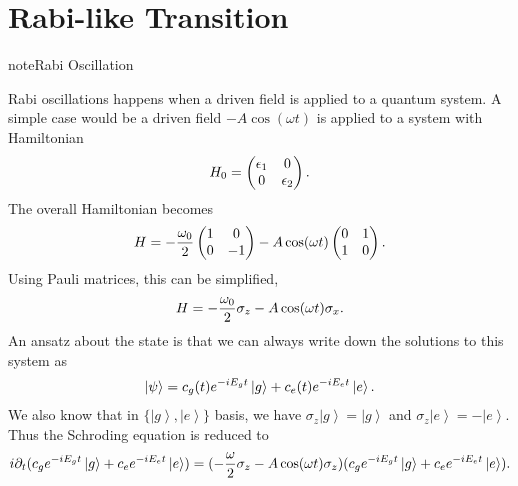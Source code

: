 \documentclass[letterpaper,12pt,english]{sphinxmanual}
\newcommand{\ket}[1]{\left| #1\right\rangle}
\begin{document}
\section{Rabi-like Transition}
\label{matter-driven:rabi-like-transition}
\begin{notice}{note}{Rabi Oscillation}

Rabi oscillations happens when a driven field is applied to a quantum system. A simple case would be a driven field \(-A\cos(\omega t)\) is applied to a system with Hamiltonian
\begin{gather}
\begin{split}H_0 = \begin{pmatrix} \epsilon_1 & 0 \\ 0 & \epsilon_2 \end{pmatrix}.\end{split}\notag
\end{gather}
The overall Hamiltonian becomes
\begin{gather}
\begin{split}H = -\frac{\omega_0}{2} \begin{pmatrix} 1 & 0 \\ 0 & -1 \end{pmatrix} - A \cos(\omega t)\begin{pmatrix} 0 & 1 \\ 1 & 0  \end{pmatrix} .\end{split}\notag
\end{gather}
Using Pauli matrices, this can be simplified,
\begin{gather}
\begin{split}H = -\frac{\omega_0}{2}\sigma_z - A\cos(\omega t)\sigma_x .\end{split}\notag
\end{gather}
An ansatz about the state is that we can always write down the solutions to this system as
\begin{gather}
\begin{split}\ket{\psi} = c_g(t) e^{-iE_g t}\ket{g} + c_e(t) e^{-i E_e t} \ket{e}.\end{split}\notag
\end{gather}
We also know that in \(\{\ket{g},\ket{e}\}\) basis, we have \(\sigma_z \ket{g}=\ket{g}\) and \(\sigma_z\ket{e}=-\ket{e}\). Thus the Schroding equation is reduced to
\begin{gather}
\begin{split}i\partial_t( c_g e^{-iE_gt}\ket{g}+c_e e^{-iE_et}\ket{e} )=(-\frac{\omega}{2}\sigma_z - A\cos(\omega t) \sigma_z)( c_g e^{-iE_gt}\ket{g}+c_e e^{-iE_et}\ket{e} ).\end{split}\notag

\end{gather}
\end{notice}
\end{document}
